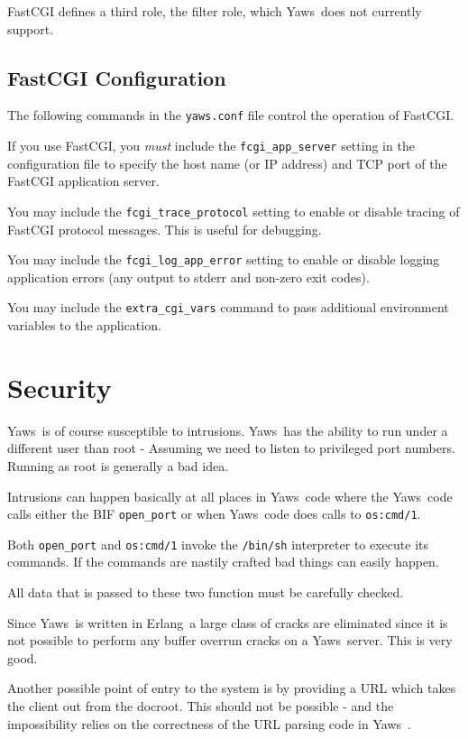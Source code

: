 \documentclass[11pt,oneside,english]{book}
\newcommand{\Erlang}            %
        {{\sc Erlang}}
\newcommand{\Yaws}            %
        {{\sc Yaws}}
\begin{document}
FastCGI defines a third role, the filter role, which
\Yaws\  does not currently support.


\section{FastCGI Configuration}

The following commands in the \verb+yaws.conf+ file control the
operation of FastCGI.

If you use FastCGI, you \emph{must} include the \verb+fcgi_app_server+
setting in the configuration file to specify the host name (or IP address)
and TCP port of the FastCGI application server.

You may include the \verb+fcgi_trace_protocol+ setting to enable or disable
tracing of FastCGI protocol messages. This is useful for debugging.

You may include the \verb+fcgi_log_app_error+ setting to enable or disable
logging application errors (any output to stderr and non-zero exit codes).

You may include the \verb+extra_cgi_vars+ command to pass additional
environment variables to the application.


\chapter{Security}

\Yaws\  is of course susceptible to intrusions. \Yaws\  has the
ability to run under a different user than root - Assuming we need
to listen to privileged port numbers. Running as root is generally a
bad idea.

Intrusions can happen basically at all places in \Yaws\  code where the
\Yaws\  code calls either the BIF \verb+open_port+ or when \Yaws\  code
does calls to \verb+os:cmd/1+.

Both \verb+open_port+ and \verb+os:cmd/1+ invoke the \verb+/bin/sh+
interpreter to execute its commands. If the commands are nastily
crafted bad things can easily happen.

All data that is passed to these two function must be carefully
checked.

Since \Yaws\  is written in \Erlang\  a large class of cracks are
eliminated since it is not possible to perform any buffer overrun
cracks on a \Yaws\  server. This is very good.


Another possible point of entry to the system is by providing a URL
which takes the client out from the docroot. This should not be
possible - and the impossibility relies on the correctness of the URL
parsing code in \Yaws\ .
\end{document}
